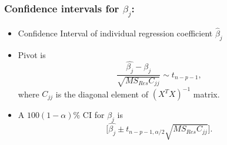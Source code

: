 \documentclass[10pt]{beamer} %
\begin{document}

\begin{frame}
   \frametitle{Confidence intervals for $\beta_j$: }
   \begin{itemize}
      \item Confidence Interval of individual regression coefficient $\hat\beta_j$
         \vspace{0.5cm}
      \item Pivot is
         $$ \frac{\hat{\beta_j} - \beta_{j}}{\sqrt{MS_{Res}C_{jj}}} \sim t_{n-p-1}, $$
         where $C_{jj}$ is the diagonal element of $(X^TX)^{-1}$ matrix. 
         \vspace{0.5cm}
      \item A $100(1-\alpha)\%$ CI for $\beta_j$ is 
         $$\Bigg[\hat{\beta_j} \pm t_{n-p-1, \alpha/2} \sqrt{MS_{Res}C_{jj}} \Bigg]. $$
   \end{itemize}	
\end{frame}
\end{document}
